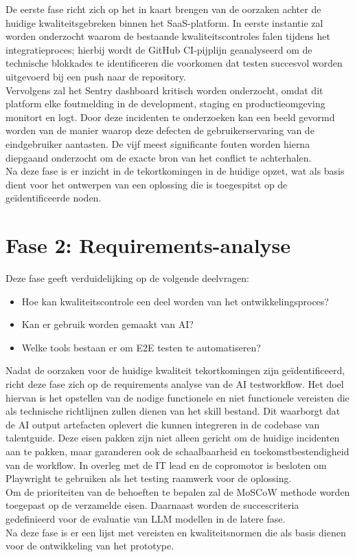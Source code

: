 De eerste fase richt zich op het in kaart brengen van de oorzaken achter de huidige kwaliteitsgebreken binnen het SaaS-platform. In eerste instantie zal worden onderzocht waarom de bestaande kwaliteitscontroles falen tijdens het integratieproces; hierbij wordt de GitHub CI-pijplijn geanalyseerd om de technische blokkades te identificeren die voorkomen dat testen succesvol worden uitgevoerd bij een push naar de repository.
\bigskip
\\
Vervolgens zal het Sentry dashboard kritisch worden onderzocht, omdat dit platform elke foutmelding in de development, staging en productieomgeving monitort en logt. Door deze incidenten te onderzoeken kan een beeld gevormd worden van de manier waarop deze defecten de gebruikerservaring van de eindgebruiker aantasten. De vijf meest significante fouten worden hierna diepgaand onderzocht om de exacte bron van het conflict te achterhalen.
\bigskip
\\
Na deze fase is er inzicht in de tekortkomingen in de huidige opzet, wat als basis dient voor het ontwerpen van een oplossing die is toegespitst op de geïdentificeerde noden.

\section{Fase 2: Requirements-analyse}

Deze fase geeft verduidelijking op de volgende deelvragen:
\begin{itemize}
    \item Hoe kan kwaliteitscontrole een deel worden van het ontwikkelingsproces?
    \item Kan er gebruik worden gemaakt van AI?
    \item Welke tools bestaan er om E2E testen te automatiseren?
\end{itemize}

Nadat de oorzaken voor de huidige kwaliteit tekortkomingen zijn geïdentificeerd, richt deze fase zich op de requirements analyse van de AI testworkflow. 
Het doel hiervan is het opstellen van de nodige functionele en niet functionele vereisten die als technische richtlijnen zullen dienen van het skill bestand. Dit waarborgt dat de AI output artefacten oplevert die kunnen integreren in de codebase van talentguide.
Deze eisen pakken zijn niet alleen gericht om de huidige incidenten aan te pakken, maar garanderen ook de schaalbaarheid en toekomstbestendigheid van de workflow. In overleg met de IT lead en de copromotor is besloten om Playwright te gebruiken als het testing raamwerk voor de oplossing.
\bigskip
\\
Om de prioriteiten van de behoeften te bepalen zal de MoSCoW methode worden toegepast op de verzamelde eisen. Daarnaast worden de succescriteria gedefinieerd voor de evaluatie van LLM modellen in de latere fase.
\bigskip
\\
Na deze fase is er een lijst met vereisten en kwaliteitsnormen die als basis dienen voor de ontwikkeling van het prototype.

